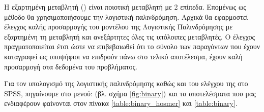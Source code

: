 \documentclass{assignment}
\begin{document}
\clearpage

\begin{Assignment}[Μέρος Ε]

Η εξαρτημένη μεταβλητή () είναι ποιοτική μεταβλητή με 2 επίπεδα. Επομένως ως μέθοδο θα χρησιμοποιήσουμε την λογιστική παλινδρόμηση. Αρχικά θα εφαρμοστεί έλεγχος καλής προσαρμογής του μοντέλου της Λογιστικής Παλινδρόμησης με εξαρτημένη τη μεταβλητή  και ανεξάρτητες όλες τις υπόλοιπες μεταβλητές. Ο έλεγχος  πραγματοποιείται έτσι ώστε να επιβεβαιωθεί ότι το σύνολο των παραγόντων  που έχουν καταγραφεί ως υποψήφιοι να επιδρούν πάνω στο τελικό αποτέλεσμα, έχουν καλή προσαρμογή στα δεδομένα του προβλήματος.

Για τον υπολογισμό της λογιστικής παλινδρόμησης καθώς και του ελέγχου της στο SPSS, πηγαίνουμε στο μενού:  (βλ. σχήμα \ref{fig:binary}) και τα αποτελέσματα που μας ενδιαφέρουν φαίνονται στον πίνακα \ref{table:binary_hosmer} και \ref{table:binary}.


\end{Assignment}
\end{document}
